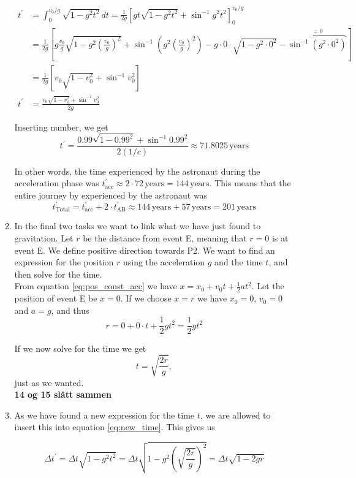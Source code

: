 \documentclass[a4paper,10pt,english]{article}
\begin{document}
\begin{enumerate}
\begin{enumerate}
\begin{align*}
t^{\prime}&=\int_{0}^{v_{0}/g}\sqrt{1-g^{2}t^{2}}\,dt=\frac{1}{2g}\left[gt\sqrt{1-g^{2}t^{2}}+\sin^{-1}{g^{2}t^{2}}\right]_{0}^{v_{0}/g}\\
&=\frac{1}{2g}\left[g\frac{v_{0}}{g}\sqrt{1-g^{2}\left(\frac{v_{0}}{g}\right)^{2}}+\sin^{-1}\left({g^{2}\left(\frac{v_{0}}{g}\right)^{2}}\right)-g\cdot0\cdot\sqrt{1-g^{2}\cdot0^{2}}-\overbrace{\sin^{-1}\left({g^{2}\cdot0^{2}}\right)}^{=0}\right]\\
&=\frac{1}{2g}\left[v_{0}\sqrt{1-v_{0}^{2}}+\sin^{-1}{v_{0}^{2}}\right]\\
t^{\prime}&=\frac{v_{0}\sqrt{1-v_{0}^{2}}+\sin^{-1}{v_{0}^{2}}}{2g}
\end{align*}


Inserting number, we get
\[t^{\prime}=\frac{0.99\sqrt{1-0.99^{2}}+\sin^{-1}{0.99^{2}}}{2(1/c)}\approx71.8025\,\text{years}\]

In other words, the time experienced by the astronaut during the acceleration phase was $t_{\text{acc}}^{\prime}\approx2\cdot72\,\text{years}=144\,\text{years}$. This means that the entire journey by experienced by the astronaut was \[t_{\text{Total}}^{\prime}=t_{\text{acc}}^{\prime}+2\cdot t_{\text{AB}}^{\prime}\approx144\,\text{years}+57\,\text{years}=201\,\text{years}\]


\item In the final two tasks we want to link what we have just found to gravitation. Let $r$ be the distance from event E, meaning that $r=0$ is at event E. We define positive direction towards P2. We want to find an expression for the position $r$ using the acceleration $g$ and the time $t$, and then solve for the time.
\\
From equation \ref{eq:pos_const_acc} we have $x=x_{0}+v_{0}t+\frac{1}{2}at^{2}$. Let the position of event E be $x=0$. If we choose $x=r$ we have $x_{0}=0$, $v_{0}=0$ and $a=g$, and thus
\[r=0+0\cdot t+\frac{1}{2}gt^{2}=\frac{1}{2}gt^{2}\]

If we now solve for the time we get
\[t=\sqrt{\frac{2r}{g}},\]
just as we wanted.
\\
\textbf{14 og 15 slått sammen}
\\

\item As we have found a new expression for the time $t$, we are allowed to insert this into equation \ref{eq:new_time}. This gives us

\begin{equation}\label{eq:new_time_mark}
\Delta t^{\prime}=\Delta t\sqrt{1-g^{2}t^{2}}=\Delta t\sqrt{1-g^{2}\left(\sqrt{\frac{2r}{g}}\right)^{2}}=\Delta t\sqrt{1-2gr}
\end{equation}


\end{enumerate}
\end{enumerate}
\end{document}
